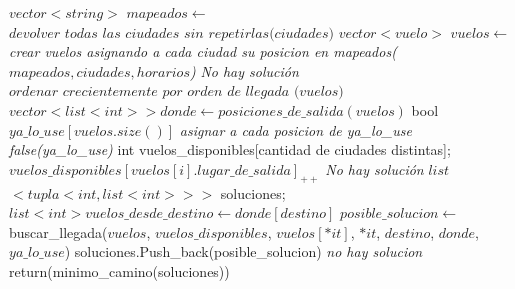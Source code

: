 \documentclass[a4paper]{article}
\begin{document}
 
\vspace{0.4cm}
\begin{algorithmic}[1]
        \State $vector<string>$ $mapeados \gets$ $\textit{devolver todas las ciudades sin repetirlas(ciudades)}$
        \State $vector<vuelo>$ $vuelos\gets$ \textit{crear vuelos asignando a cada ciudad su posicion en mapeados($mapeados, ciudades, horarios$)}
        		\State \textit{No hay solución}
        	\Else 
        		\State $\textit{ordenar crecientemente por orden de llegada (vuelos)}$
        		\State $vector <list <int> > donde \gets posiciones\_de\_salida(vuelos)$
			\State bool $ya\_lo\_use[vuelos.size()]$ 
			\State \textit{asignar a cada posicion de ya\_lo\_use false(ya\_lo\_use)}       		
        		\State int vuelos\_disponibles[cantidad de ciudades distintas];
        			\State $vuelos\_disponibles[vuelos[i].lugar\_de\_salida]_{++}$
        		\EndFor	
        			\State \textit{No hay solución}
        		\Else	
       			\State $list$ $<tupla<int, list<int> > >$ soluciones; 
				\State $list<int> vuelos\_desde\_destino \gets donde[destino]$ 		
					\State $posible\_solucion\gets$ buscar\_llegada($vuelos$, $vuelos\_disponibles$, $vuelos[*it]$, $*it$,  $destino$, $donde$, $ya\_lo\_use$)
					\State soluciones.Push\_back(posible\_solucion)
				\EndFor
					\State \textit{no hay solucion}
				\Else
					\State return(minimo\_camino(soluciones))
				\EndIf
			\EndIf
		 \EndIf			 	
\EndProcedure
\end{algorithmic}
\end{document}
